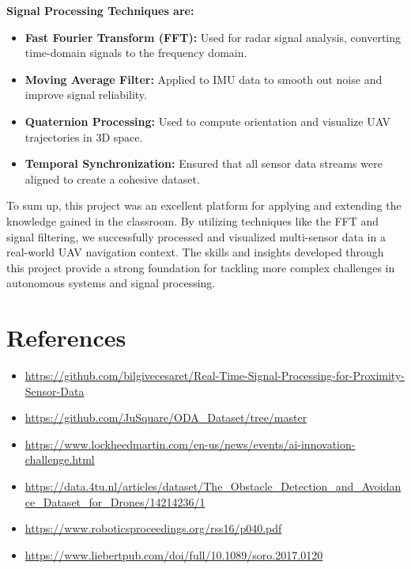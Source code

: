 \documentclass[12pt,a4paper]{article}
\begin{document}
\textbf{Signal Processing Techniques are:}
\begin{itemize}
    \item \textbf{Fast Fourier Transform (FFT):} Used for radar signal analysis, converting time-domain signals to the frequency domain.
    \item \textbf{Moving Average Filter:} Applied to IMU data to smooth out noise and improve signal reliability.
    \item \textbf{Quaternion Processing:} Used to compute orientation and visualize UAV trajectories in 3D space.
    \item \textbf{Temporal Synchronization:} Ensured that all sensor data streams were aligned to create a cohesive dataset.
\end{itemize}

To sum up, this project was an excellent platform for applying and extending the knowledge gained in the classroom. By utilizing techniques like the FFT and signal filtering, we successfully processed and visualized multi-sensor data in a real-world UAV navigation context. The skills and insights developed through this project provide a strong foundation for tackling more complex challenges in autonomous systems and signal processing.


\section*{References}
\begin{itemize}
    \item \url{https://github.com/bilgivecesaret/Real-Time-Signal-Processing-for-Proximity-Sensor-Data}
    \item \url{https://github.com/JuSquare/ODA_Dataset/tree/master}
    \item \url{https://www.lockheedmartin.com/en-us/news/events/ai-innovation-challenge.html}
    \item \url{https://data.4tu.nl/articles/dataset/The_Obstacle_Detection_and_Avoidance_Dataset_for_Drones/14214236/1}
    \item  \url{https://www.roboticsproceedings.org/rss16/p040.pdf}
    \item \url{https://www.liebertpub.com/doi/full/10.1089/soro.2017.0120}   
\end{itemize}
\end{document}

